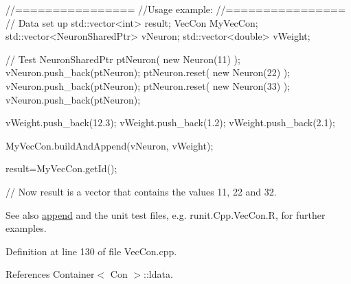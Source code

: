 \begin{DoxyCode}
        //================
        //Usage example:
        //================
        // Data set up
                std::vector<int> result;
                VecCon MyVecCon;
                std::vector<NeuronSharedPtr> vNeuron;
                std::vector<double> vWeight;


        // Test
                NeuronSharedPtr ptNeuron( new Neuron(11) );
                vNeuron.push_back(ptNeuron);
                ptNeuron.reset( new Neuron(22) );
                vNeuron.push_back(ptNeuron);
                ptNeuron.reset( new Neuron(33) );
                vNeuron.push_back(ptNeuron);

                vWeight.push_back(12.3);
                vWeight.push_back(1.2);
                vWeight.push_back(2.1);

                MyVecCon.buildAndAppend(vNeuron, vWeight);

                result=MyVecCon.getId();

        // Now result is a vector that contains the values 11, 22 and 32.
\end{DoxyCode}


\begin{DoxySeeAlso}{See also}
\hyperlink{classvec_a_m_o_r_e_ab060ffa67e85997fc4236bedfd2f17b6}{append} and the unit test files, e.g. runit.Cpp.VecCon.R, for further examples. 
\end{DoxySeeAlso}


Definition at line 130 of file VecCon.cpp.



References Container$<$ Con $>$::ldata.


